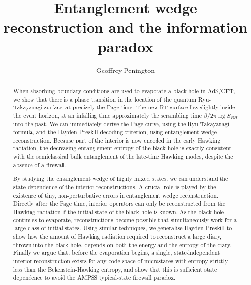 \documentclass[11pt,a4paper]{article}
\begin{document}
\title{\bf Entanglement wedge reconstruction and the information paradox}
\author[1]{Geoffrey Penington}
\date{}
\maketitle
\begin{abstract}
When absorbing boundary conditions are used to evaporate a black hole in AdS/CFT, we show that there is a phase transition in the location of the quantum Ryu-Takayanagi surface, at precisely the Page time. The new RT surface lies slightly inside the event horizon, at an infalling time approximately the scrambling time $\beta/2\pi \log S_{BH}$ into the past. We can immediately derive the Page curve, using the Ryu-Takayanagi formula, and the Hayden-Preskill decoding criterion, using entanglement wedge reconstruction. Because part of the interior is now encoded in the early Hawking radiation, the decreasing entanglement entropy of the black hole is exactly consistent with the semiclassical bulk entanglement of the late-time Hawking modes, despite the absence of a firewall.

By studying the entanglement wedge of highly mixed states, we can understand the state dependence of the interior reconstructions. A crucial role is played by the existence of tiny, non-perturbative errors in entanglement wedge reconstruction. Directly after the Page time, interior operators can only be reconstructed from the Hawking radiation if the initial state of the black hole is known. As the black hole continues to evaporate, reconstructions become possible that simultaneously work for a large class of initial states. Using similar techniques, we generalise Hayden-Preskill to show how the amount of Hawking radiation required to reconstruct a large diary, thrown into the black hole, depends on both the energy and the entropy of the diary. Finally we argue that, before the evaporation begins, a single, state-independent interior reconstruction exists for any code space of microstates with entropy strictly less than the Bekenstein-Hawking entropy, and show that this is sufficient state dependence to avoid the AMPSS typical-state firewall paradox.

\noindent
\let\thefootnote\relax\footnotetext{\hspace{-0.75cm}{\tt geoffp@stanford.edu}}

\end{abstract}
\end{document}
